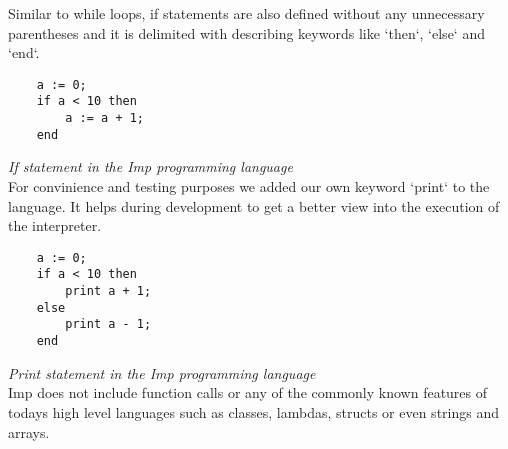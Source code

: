 \documentclass{article}
\begin{document}
Similar to while loops, if statements are also defined without any unnecessary
parentheses and it is delimited with describing keywords like `then`, `else`
and `end`.

\begin{verbatim}
    a := 0;
    if a < 10 then
        a := a + 1;
    end
\end{verbatim}
\textit{If statement in the Imp programming language} \\

For convinience and testing purposes we added our own keyword `print` to the
language. It helps during development to get a better view into the execution
of the interpreter.

\begin{verbatim}
    a := 0;
    if a < 10 then
        print a + 1;
    else
        print a - 1;
    end
\end{verbatim}
\textit{Print statement in the Imp programming language} \\

Imp does not include function calls or any of the commonly known features of
todays high level languages such as classes, lambdas, structs or even strings
and arrays.

\clearpage


\end{document}
